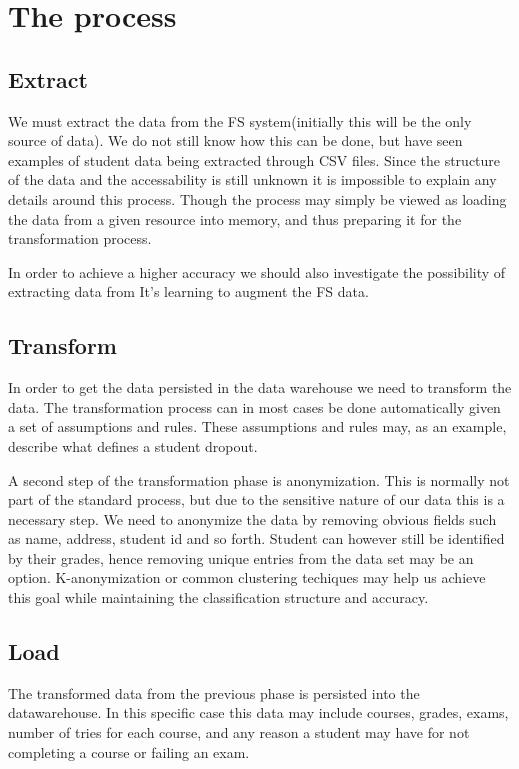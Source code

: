 \section{The process}
\subsection{Extract}
We must extract the data from the FS system(initially this will be the only source of data). We do not still know how this can be done, but have seen examples of student data being extracted through CSV files. 
Since the structure of the data and the accessability is still unknown it is impossible to explain any details around this process.
Though the process may simply be viewed as loading the data from a given resource into memory, and thus preparing it for the transformation process.

\bigskip\noindent
In order to achieve a higher accuracy we should also investigate 
the possibility of extracting data from It's learning to augment the FS data.

\subsection{Transform}
In order to get the data persisted in the data warehouse we need to transform the data.
The transformation process can in most cases be done automatically given a set of assumptions and rules.
These assumptions and rules may, as an example, describe what defines a student dropout. 

\bigskip\noindent
A second step of the transformation phase is anonymization. 
This is normally not part of the standard process, but due to the sensitive nature of our data this is a necessary step.
We need to anonymize the data by removing obvious fields such as name, address, student id and so forth. 
Student can however still be identified by their grades, hence removing unique entries from the data set may be an option.
K-anonymization or common clustering techiques may help us achieve this goal while maintaining the classification structure and accuracy.

\subsection{Load}
The transformed data from the previous phase is persisted into the datawarehouse. 
In this specific case this data may include courses, grades, exams, number of tries for each course, 
and any reason a student may have for not completing a course or failing an exam.

